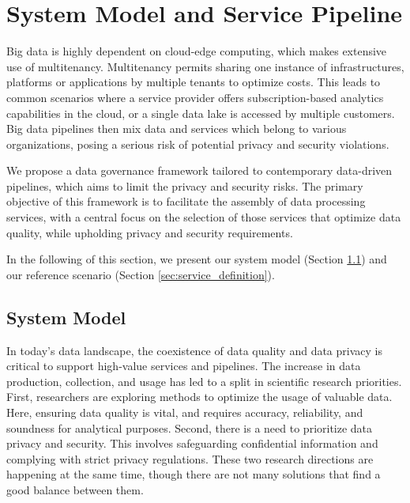\section{System Model and Service Pipeline}\label{sec:requirements}
Big data is highly dependent on cloud-edge computing, which makes extensive use of multitenancy.
Multitenancy permits sharing one instance of infrastructures, platforms or applications by multiple tenants to optimize costs. This leads to common scenarios where a service provider offers subscription-based analytics capabilities in the cloud, or a single data lake is accessed by multiple customers. Big data pipelines then mix data and services which belong to various organizations, posing a serious risk of potential privacy and security violations.

We propose a data governance framework tailored to contemporary data-driven pipelines, which aims to limit the privacy and security risks. The primary objective of this framework is to facilitate the assembly of data processing services, with a central focus on the selection of those services that optimize data quality, while upholding privacy and security requirements.

In the following of this section, we present our system model (Section \ref{sec:systemmodel}) and our reference scenario (Section \ref{sec:service_definition}).

\subsection{System Model}\label{sec:systemmodel}
In today's data landscape, the coexistence of data quality and data privacy is critical to support high-value services and pipelines. The increase in data production, collection, and usage has led to a split in scientific research priorities.
First, researchers are exploring methods to optimize the usage of valuable data. Here, ensuring data quality is vital, and requires accuracy, reliability, and soundness for analytical purposes.
Second, there is a need to prioritize data privacy and security. This involves safeguarding confidential information and complying with strict privacy regulations. These two research directions are happening at the same time, though there are not many solutions that find a good balance between them.

